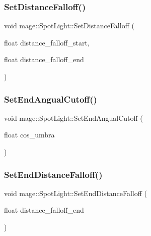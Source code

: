\hypertarget{classmage_1_1_spot_light_a0846a1af219d18c711d165c8cea57e88}{}\label{classmage_1_1_spot_light_a0846a1af219d18c711d165c8cea57e88} 
\subsubsection{\texorpdfstring{Set\+Distance\+Falloff()}{SetDistanceFalloff()}}
{\footnotesize\ttfamily void mage\+::\+Spot\+Light\+::\+Set\+Distance\+Falloff (\begin{DoxyParamCaption}\item[{float}]{distance\+\_\+falloff\+\_\+start,  }\item[{float}]{distance\+\_\+falloff\+\_\+end }\end{DoxyParamCaption})}

\hypertarget{classmage_1_1_spot_light_aac3d213799cf442a993134ca186fcd8a}{}\label{classmage_1_1_spot_light_aac3d213799cf442a993134ca186fcd8a} 
\subsubsection{\texorpdfstring{Set\+End\+Angual\+Cutoff()}{SetEndAngualCutoff()}}
{\footnotesize\ttfamily void mage\+::\+Spot\+Light\+::\+Set\+End\+Angual\+Cutoff (\begin{DoxyParamCaption}\item[{float}]{cos\+\_\+umbra }\end{DoxyParamCaption})}

\hypertarget{classmage_1_1_spot_light_a12ffc1d8365297de853041dd652c7039}{}\label{classmage_1_1_spot_light_a12ffc1d8365297de853041dd652c7039} 
\subsubsection{\texorpdfstring{Set\+End\+Distance\+Falloff()}{SetEndDistanceFalloff()}}
{\footnotesize\ttfamily void mage\+::\+Spot\+Light\+::\+Set\+End\+Distance\+Falloff (\begin{DoxyParamCaption}\item[{float}]{distance\+\_\+falloff\+\_\+end }\end{DoxyParamCaption})}

